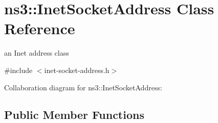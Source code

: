 \hypertarget{classns3_1_1InetSocketAddress}{}\section{ns3\+:\+:Inet\+Socket\+Address Class Reference}
\label{classns3_1_1InetSocketAddress}


an Inet address class  




{\ttfamily \#include $<$inet-\/socket-\/address.\+h$>$}



Collaboration diagram for ns3\+:\+:Inet\+Socket\+Address\+:
\subsection*{Public Member Functions}
